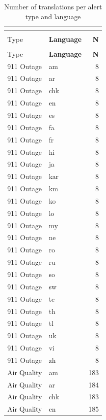 \begin{longtable}{p{3cm} p{3cm} r}
\caption{Number of translations per alert type and language} \\
\label{tab:translations_full} \\
\hline
\textbf{Alert\\Type} & \textbf{Language} & \textbf{N} \\
\hline
\endfirsthead

\hline
\textbf{Alert\\Type} & \textbf{Language} & \textbf{N} \\
\hline
\endhead

\hline
\endfoot

\hline
\endlastfoot

911 Outage & am & 8 \\
911 Outage & ar & 8 \\
911 Outage & chk & 8 \\
911 Outage & en & 8 \\
911 Outage & es & 8 \\
911 Outage & fa & 8 \\
911 Outage & fr & 8 \\
911 Outage & hi & 8 \\
911 Outage & ja & 8 \\
911 Outage & kar & 8 \\
911 Outage & km & 8 \\
911 Outage & ko & 8 \\
911 Outage & lo & 8 \\
911 Outage & my & 8 \\
911 Outage & ne & 8 \\
911 Outage & ro & 8 \\
911 Outage & ru & 8 \\
911 Outage & so & 8 \\
911 Outage & sw & 8 \\
911 Outage & te & 8 \\
911 Outage & th & 8 \\
911 Outage & tl & 8 \\
911 Outage & uk & 8 \\
911 Outage & vi & 8 \\
911 Outage & zh & 8 \\
Air Quality & am & 183 \\
Air Quality & ar & 184 \\
Air Quality & chk & 183 \\
Air Quality & en & 185 \\

\end{longtable}
